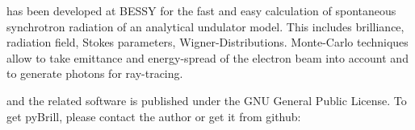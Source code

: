 

\large
\PB has been developed at BESSY for the fast and easy calculation of
spontaneous synchrotron radiation of an analytical undulator model.
This includes brilliance,
radiation field, Stokes parameters, Wigner-Distributions.
Monte-Carlo techniques allow to take emittance and energy-spread of
the electron beam into account and to generate
photons for ray-tracing.

\PB and the related software is published under the GNU General Public
License. To get pyBrill, please contact the author or get it from github:

~~~~~

